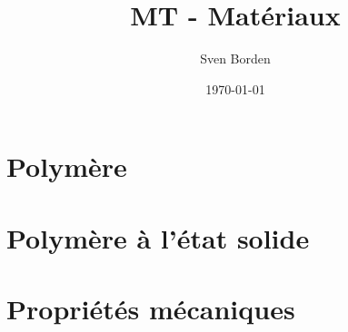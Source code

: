\documentclass[12pt]{report}
\title{MT - Matériaux}
\author{Sven Borden}
\date{\today}
\begin{document}
	\maketitle	
	\tableofcontents
	\clearpage

	\chapter{Polymère}	
	
	\chapter{Polymère à l'état solide}
	
	\chapter{Propriétés mécaniques}
	
\end{document}
